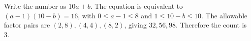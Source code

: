 Write the number as $10a+b$. The equation is equivalent to $(a-1)(10-b)=16$, with $0\le a-1\le8$ and $1\le10-b\le10$. The allowable factor pairs are $(2,8),(4,4),(8,2)$, giving $32,56,98$. Therefore the count is $\boxed3$.
